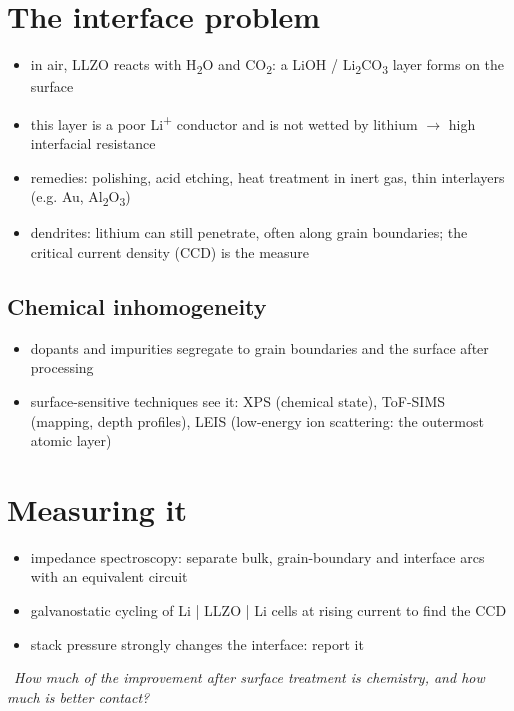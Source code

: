 \documentclass[11pt]{article}
\newcommand\knotetime[1]{\leavevmode\llap{\color{knotemuted}\scriptsize #1\hspace{1em}}}
\newcommand\knotequestion[2][]{\par\noindent#1{\color{knoteaccent}\textbf{?}}~\emph{#2}\par}
\newenvironment{knotechunk}{}{}
\begin{document}
\begin{knotechunk}
\section{The interface problem}

\begin{itemize}\setlength{\itemsep}{0pt}\setlength{\parskip}{0pt}
  \item in air, LLZO reacts with H\textsubscript{2}O and CO\textsubscript{2}: a LiOH / Li\textsubscript{2}CO\textsubscript{3} layer forms on the surface
  \item this layer is a poor Li\textsuperscript{+} conductor and is not wetted by lithium \ensuremath{\rightarrow} high interfacial resistance
  \item remedies: polishing, acid etching, heat treatment in inert gas, thin interlayers (e.g. Au, Al\textsubscript{2}O\textsubscript{3})
  \item dendrites: lithium can still penetrate, often along grain boundaries; the critical current density (CCD) is the measure
\end{itemize}

\subsection{Chemical inhomogeneity}

\begin{itemize}\setlength{\itemsep}{0pt}\setlength{\parskip}{0pt}
  \item dopants and impurities segregate to grain boundaries and the surface after processing
  \item surface-sensitive techniques see it: XPS (chemical state), ToF-SIMS (mapping, depth profiles), LEIS (low-energy ion scattering: the outermost atomic layer)
\end{itemize}
\end{knotechunk}

\begin{knotechunk}
\section{Measuring it}

\begin{itemize}\setlength{\itemsep}{0pt}\setlength{\parskip}{0pt}
  \item impedance spectroscopy: separate bulk, grain-boundary and interface arcs with an equivalent circuit
  \item galvanostatic cycling of Li | LLZO | Li cells at rising current to find the CCD
  \item stack pressure strongly changes the interface: report it
\end{itemize}

\knotequestion[\knotetime{33:40}]{How much of the improvement after surface treatment is chemistry, and how much is better contact?}
\end{knotechunk}
\end{document}
